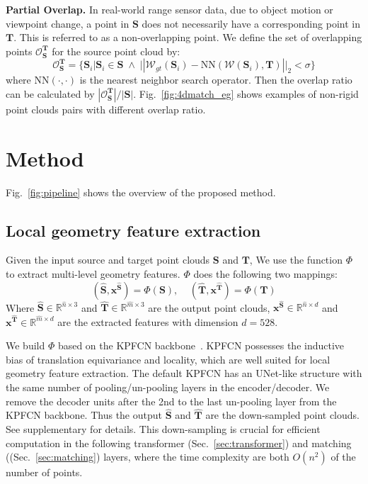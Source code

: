 \smallskip
\noindent
\textbf{Partial Overlap.}
In real-world range sensor data, due to object motion or viewpoint change, a point in $\mathbf{S}$ does not necessarily have a corresponding point in $\mathbf{T}$. This is referred to as a non-overlapping point. 
We define the set of overlapping points $\mathcal{O}^{\mathbf{T}}_{\mathbf{S}}$ for the source point cloud by:
$$
\mathcal{O}^{\mathbf{T}}_{\mathbf{S}}=\{ \mathbf{S}_i| \mathbf{S}_i \in \mathbf{S}\; \wedge \; ||\mathcal{W}_{gt}(\mathbf{S}_i) - \text{NN}(\mathcal{W}(\mathbf{S}_i), \mathbf{T}) ||_2  < \sigma \}
$$
where $\text{NN}(\cdot,\cdot)$ is the nearest neighbor search operator.
Then the overlap ratio can be calculated by $|\mathcal{O}^{\mathbf{T}}_{\mathbf{S}}|/|\mathbf{S}|$. Fig.~\ref{fig:4dmatch_eg} shows examples of non-rigid point clouds pairs with different overlap ratio. 


\section{Method}

Fig.~\ref{fig:pipeline} shows the overview of the proposed method.

\subsection{Local geometry feature extraction}\label{sec:backbone}
Given the input source and target point clouds $\mathbf{S}$ and $\mathbf{T}$,
We use the function $\Phi$ to extract multi-level geometry features. $\Phi$ does the following two mappings:
$$   
(\mathbf{\hat{S}}, \mathbf{x}^\mathbf{\hat{S}} ) = \Phi (\mathbf{S}) ,   \;\;\;\;   (\mathbf{\hat{T}}, \mathbf{x}^\mathbf{\hat{T}} ) = \Phi (\mathbf{T})
$$
Where $\mathbf{\hat{S}} \in \mathbb{R}^{\hat{n}\times3}$ and  $\mathbf{\hat{T}} \in \mathbb{R}^{\hat{m}\times3}$ are the output point clouds, $\mathbf{x}^\mathbf{\hat{S}} \in \mathbb{R}^{\hat{n}\times d}$ and $\mathbf{x}^\mathbf{\hat{T}} \in \mathbb{R}^{\hat{m}\times d}$ are the extracted features with dimension $d=528$.

We build $\Phi$ based on the  KPFCN backbone~\cite{thomas2019kpconv}.
KPFCN possesses the inductive bias of translation equivariance and locality, which are well suited for local geometry feature extraction.
The default KPFCN has an UNet-like structure with the same number of pooling/un-pooling layers in the encoder/decoder. We remove the decoder units after the 2nd to the last un-pooling layer from the KPFCN backbone. Thus the output $\mathbf{\hat{S}}$ and $\mathbf{\hat{T}}$ are the down-sampled point clouds. See supplementary for details.
This down-sampling is crucial for efficient computation in the following transformer (Sec.~\ref{sec:transformer}) and matching ((Sec.~\ref{sec:matching}) layers, where the time complexity are both $O(n^2)$ of the number of points.


